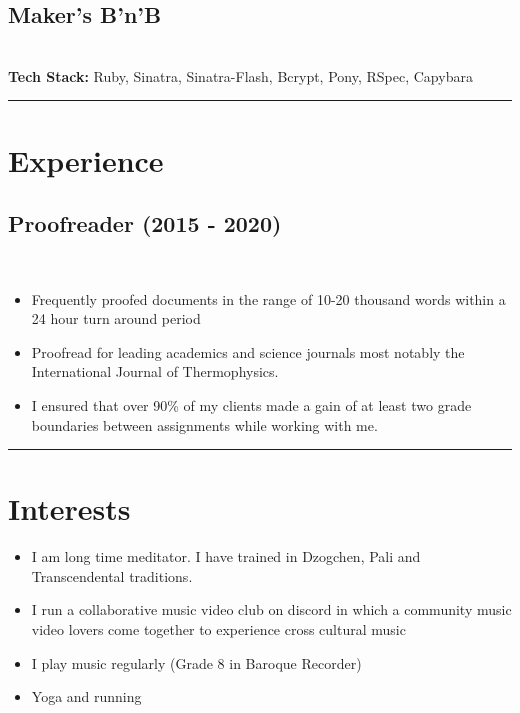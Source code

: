 \documentclass[12pt]{IEEEtran}
\newcommand{\cvrule}{\noindent\rule{8.5cm}{0.4pt}}
\begin{document}
\subsection*{Maker's B'n'B}
 \\
\textbf{Tech Stack:} Ruby, Sinatra, Sinatra-Flash, Bcrypt, Pony, RSpec, Capybara %

\cvrule
\vskip 0.35in

\section*{Experience}

\subsection*{Proofreader (2015 - 2020)}
\\[1pt]
\begin{itemize}
\item Frequently proofed documents in the range of 10-20 thousand words within a 24 hour turn around period
\item Proofread for leading academics and science journals most notably the International Journal of Thermophysics.
\item I ensured that over 90\% of my clients made a gain of at least two grade boundaries between assignments while working with me.
\end{itemize}

\cvrule
\vskip 0.35in
\section*{Interests}

\begin{itemize}
\item I am long time meditator. I have trained in Dzogchen, Pali and Transcendental traditions.
\item I run a collaborative music video club on discord in which a community music video lovers come together to experience cross cultural music
\item I play music regularly (Grade 8 in Baroque Recorder)
\item Yoga and running
\end{itemize}
\end{document}
